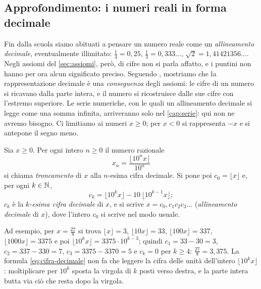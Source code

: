 \subsection{Approfondimento: i numeri reali in forma decimale}
\label{subsec:forma-decimale}

Fin dalla scuola siamo abituati a pensare un numero reale come un \emph{allineamento
decimale}, eventualmente illimitato: $\frac14=0{,}25$, $\frac13=0{,}333\ldots$,
$\sqrt2=1{,}41421356\ldots$. Negli assiomi del \cref{sec:assiomi}, però, di cifre non si
parla affatto, e i puntini non hanno per ora alcun significato preciso. Seguendo
\cite{giusti}, mostriamo che la rappresentazione decimale è una \emph{conseguenza} degli
assiomi: le cifre di un numero si ricavano dalla parte intera, e il numero si ricostruisce
dalle sue cifre con l'estremo superiore. Le serie numeriche, con le quali un allineamento
decimale si legge come una somma infinita, arriveranno solo nel \cref{cap:serie}: qui non
ne avremo bisogno. Ci limitiamo ai numeri $x\ge0$; per $x<0$ si rappresenta $-x$ e si
antepone il segno meno.

\begin{definizione}\label{def:allineamento-decimale}
Sia $x\ge0$. Per ogni intero $n\ge0$ il numero razionale
\begin{equation}\label{eq:troncamento}
  x_{n}=\frac{\lfloor10^{n}x\rfloor}{10^{n}}
\end{equation}
si chiama \emph{troncamento} di $x$ alla $n$-esima cifra decimale. Si pone poi
$c_{0}=\lfloor x\rfloor$ e, per ogni $k\in\mathbb{N}$,
\begin{equation}\label{eq:cifra-decimale}
  c_{k}=\lfloor10^{k}x\rfloor-10\,\lfloor10^{k-1}x\rfloor ;
\end{equation}
$c_{k}$ è la \emph{$k$-esima cifra decimale} di $x$, e si scrive
$x=c_{0}{,}c_{1}c_{2}c_{3}\ldots$ (\emph{allineamento decimale} di $x$), dove l'intero
$c_{0}$ si scrive nel modo usuale.
\end{definizione}

Ad esempio, per $x=\frac{27}{8}$ si trova $\lfloor x\rfloor=3$, $\lfloor10x\rfloor=33$,
$\lfloor100x\rfloor=337$, $\lfloor1000x\rfloor=3375$ e poi
$\lfloor10^{k}x\rfloor=3375\cdot10^{k-3}$; quindi $c_{1}=33-30=3$, $c_{2}=337-330=7$,
$c_{3}=3375-3370=5$ e $c_{k}=0$ per $k\ge4$: $\frac{27}{8}=3{,}375$. La formula
\eqref{eq:cifra-decimale} non fa che leggere la cifra delle unità dell'intero
$\lfloor10^{k}x\rfloor$: moltiplicare per $10^{k}$ sposta la virgola di $k$ posti verso
destra, e la parte intera butta via ciò che resta dopo la virgola.

